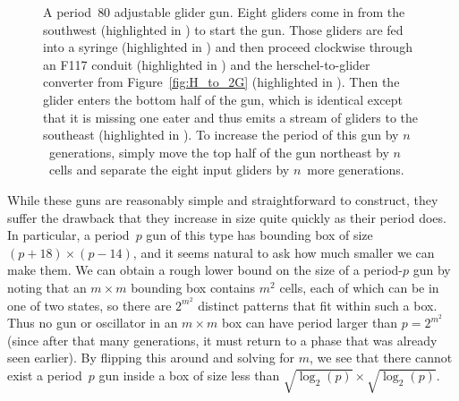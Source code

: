\begin{figure}[!ht]
	\centering
	\caption{A period~$80$ adjustable glider gun. Eight gliders come in from the southwest (highlighted in ) to start the gun. Those gliders are fed into a syringe (highlighted in ) and then proceed clockwise through an F117 conduit (highlighted in ) and the herschel-to-glider converter from Figure~\ref{fig:H_to_2G} (highlighted in ). Then the glider enters the bottom half of the gun, which is identical except that it is missing one eater and thus emits a stream of gliders to the southeast (highlighted in ). To increase the period of this gun by $n$~generations, simply move the top half of the gun northeast by $n$~cells and separate the eight input gliders by $n$~more generations.}\label{fig:p80_adjustable_gun}
\end{figure}

While these guns are reasonably simple and straightforward to construct, they suffer the drawback that they increase in size quite quickly as their period does. In particular, a period~$p$ gun of this type has bounding box of size $(p+18) \times (p-14)$, and it seems natural to ask how much smaller we can make them. We can obtain a rough lower bound on the size of a period-$p$ gun by noting that an $m \times m$ bounding box contains $m^2$ cells, each of which can be in one of two states, so there are $2^{m^2}$ distinct patterns that fit within such a box. Thus no gun or oscillator in an $m \times m$ box can have period larger than $p = 2^{m^2}$ (since after that many generations, it must return to a phase that was already seen earlier). By flipping this around and solving for $m$, we see that there cannot exist a period~$p$ gun inside a box of size less than $\sqrt{\log_2(p)} \times \sqrt{\log_2(p)}$.

